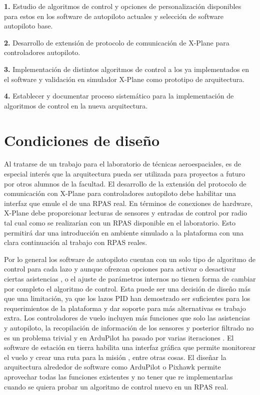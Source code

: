 \textbf{1.} Estudio de algoritmos de control y opciones de personalización disponibles para estos en los software de autopiloto actuales y selección de software autopiloto base.

\textbf{2.} Desarrollo de extensión de protocolo de comunicación de X-Plane para controladores autopiloto.

\textbf{3.} Implementación de distintos algoritmos de control a los ya implementados en el software y validación en simulador X-Plane como prototipo de arquitectura.

\textbf{4.} Establecer y documentar proceso sistemático para la implementación de algoritmos de control en la nueva arquitectura.

\section{Condiciones de diseño}

Al tratarse de un trabajo para el laboratorio de técnicas aeroespaciales, es de especial interés que la arquitectura pueda ser utilizada para proyectos a futuro por otros alumnos de la facultad. El desarrollo de la extensión del protocolo de comunicación con X-Plane para controladores autopiloto debe habilitar una interfaz que emule el de una RPAS real. En términos de conexiones de hardware, X-Plane debe proporcionar lecturas de sensores y entradas de control por radio tal cual como se realizarían con un RPAS disponible en el laboratorio. Esto permitirá dar una introducción en ambiente simulado a la plataforma con una clara continuación al trabajo con RPAS reales.

Por lo general los software de autopiloto cuentan con un solo tipo de algoritmo de control para cada lazo y aunque ofrezcan opciones para activar o desactivar ciertas asistencias \cite{ardupilot-flight-modes}, o el ajuste de parámetros internos \cite{ardupilot-plane-tuning} no tienen forma de cambiar por completo el algoritmo de control. Esta puede ser una decisión de diseño más que una limitación, ya que los lazos PID han demostrado ser suficientes para los requerimientos de la plataforma y dar soporte para más alternativas es trabajo extra. Los controladores de vuelo incluyen más funciones que solo las asistencias y autopiloto, la recopilación de información de los sensores y posterior filtrado no es un problema trivial y en ArduPilot ha pasado por varias iteraciones \cite{ardupilot-ekf}. El software de estación en tierra habilita una interfaz gráfica que permite monitorear el vuelo y crear una ruta para la misión \cite{ardupilot-gs}, entre otras cosas. El diseñar la arquitectura alrededor de software como ArduPilot o Pixhawk permite aprovechar todas las funciones existentes y no tener que re implementarlas cuando se quiera probar un algoritmo de control nuevo en un RPAS real.

